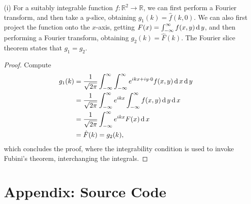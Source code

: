 \documentclass{homework}
\begin{document}
\begin{problem}
(i) For a suitably integrable function
\(f : \mathbb R^2 \to \mathbb R\), we can first
perform a Fourier transform, and then take a
\(y\)-slice, obtaining \(g_1(k) = \hat f(k, 0)\).
We can also first project the function onto
the \(x\)-axis, getting
\(F(x) = \int_{-\infty}^\infty f(x,y)\mathop{\textnormal{d}}\!\, y\),
and then performing a Fourier transform, obtaining
\(g_2(k) = \hat F(k)\). The Fourier slice theorem
states that \(g_1 = g_2\).

\begin{proof}
Compute
\[\begin{aligned}
g_1(k)
&= \frac1{\sqrt{2\pi}} \int_{-\infty}^\infty
\int_{-\infty}^\infty e^{ikx + iy\cdot 0} f(x,y) \mathop{\textnormal{d}}\!\, x \mathop{\textnormal{d}}\!\, y\\
&= \frac1{\sqrt{2\pi}} \int_{-\infty}^\infty
e^{ikx} \int_{-\infty}^\infty f(x,y) \mathop{\textnormal{d}}\!\, y \mathop{\textnormal{d}}\!\, x\\
&= \frac1{\sqrt{2\pi}} \int_{-\infty}^\infty
e^{ikx} F(x) \mathop{\textnormal{d}}\!\, x\\
&= \hat F(k) = g_2(k),
\end{aligned}\]
which concludes the proof, where the integrability
condition is used to invoke Fubini's theorem,
interchanging the integrals.
\renewcommand{\qedsymbol}{\(\square\)}
\end{proof}
\renewcommand{\qedsymbol}{}
\end{problem}

\newpage
\section*{Appendix: Source Code}
\end{document}
